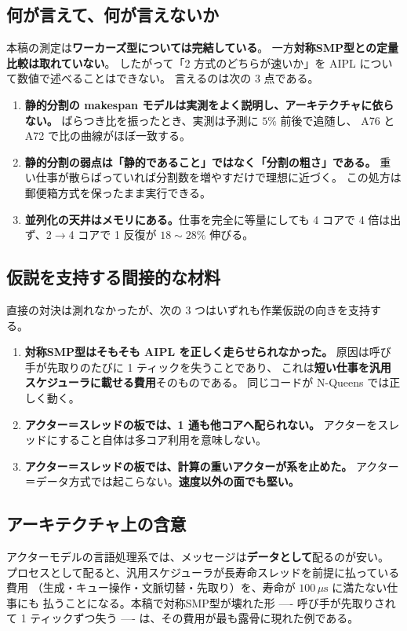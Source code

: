 \documentclass[a4paper,11pt]{ltjsarticle}
\begin{document}
\subsection{何が言えて、何が言えないか}
本稿の測定は\textbf{ワーカーズ型については完結している}。
一方\textbf{対称SMP型との定量比較は取れていない}。
したがって「2 方式のどちらが速いか」を AIPL について数値で述べることはできない。
言えるのは次の 3 点である。

\begin{enumerate}
\item \textbf{静的分割の makespan モデルは実測をよく説明し、アーキテクチャに依らない。}
      ばらつき比を振ったとき、実測は予測に $5\%$ 前後で追随し、
      A76 と A72 で比の曲線がほぼ一致する。
\item \textbf{静的分割の弱点は「静的であること」ではなく「分割の粗さ」である。}
      重い仕事が散らばっていれば分割数を増やすだけで理想に近づく。
      この処方は郵便箱方式を保ったまま実行できる。
\item \textbf{並列化の天井はメモリにある。}仕事を完全に等量にしても
      4 コアで 4 倍は出ず、2$\to$4 コアで 1 反復が $18\sim28\%$ 伸びる。
\end{enumerate}

\subsection{仮説を支持する間接的な材料}
直接の対決は測れなかったが、次の 3 つはいずれも作業仮説の向きを支持する。

\begin{enumerate}
\item \textbf{対称SMP型はそもそも AIPL を正しく走らせられなかった。}
      原因は呼び手が先取りのたびに 1 ティックを失うことであり、
      これは\textbf{短い仕事を汎用スケジューラに載せる費用}そのものである。
      同じコードが N-Queens では正しく動く。
\item \textbf{アクター＝スレッドの板では、1 通も他コアへ配られない。}
      アクターをスレッドにすること自体は多コア利用を意味しない。
\item \textbf{アクター＝スレッドの板では、計算の重いアクターが系を止めた。}
      アクター＝データ方式では起こらない。\textbf{速度以外の面でも堅い。}
\end{enumerate}

\subsection{アーキテクチャ上の含意}
アクターモデルの言語処理系では、メッセージは\textbf{データとして}配るのが安い。
プロセスとして配ると、汎用スケジューラが長寿命スレッドを前提に払っている費用
（生成・キュー操作・文脈切替・先取り）を、寿命が $100\,\mu\mathrm{s}$ に満たない仕事にも
払うことになる。本稿で対称SMP型が壊れた形 ---- 呼び手が先取りされて
1 ティックずつ失う ---- は、その費用が最も露骨に現れた例である。
\end{document}
